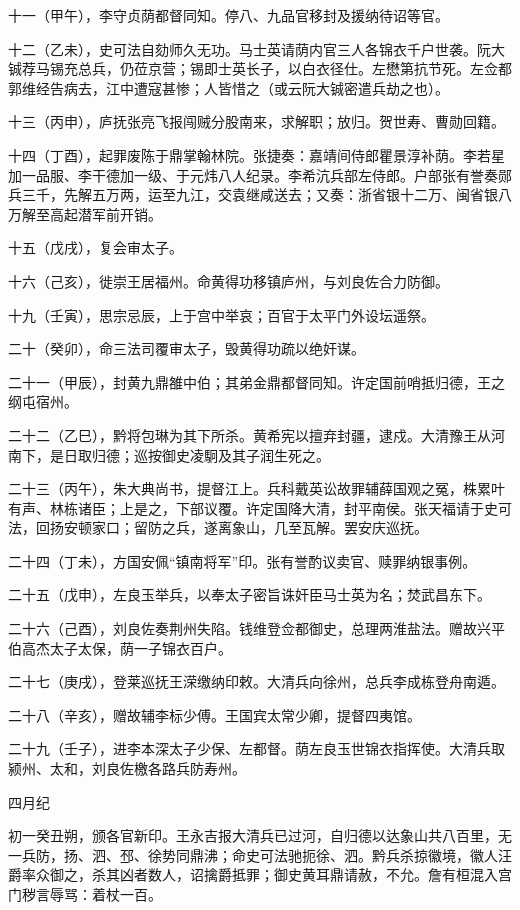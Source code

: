 \documentclass[]{article}
\begin{document}
十一（甲午），李守贞荫都督同知。停八、九品官移封及援纳待诏等官。

十二（乙未），史可法自劾师久无功。马士英请荫内官三人各锦衣千户世袭。阮大铖荐马锡充总兵，仍莅京营；锡即士英长子，以白衣径仕。左懋第抗节死。左佥都郭维经告病去，江中遭寇甚惨；人皆惜之（或云阮大铖密遣兵劫之也）。

十三（丙申），庐抚张亮飞报闯贼分股南来，求解职；放归。贺世寿、曹勋回籍。

十四（丁酉），起罪废陈于鼎掌翰林院。张捷奏：嘉靖间侍郎瞿景淳补荫。李若星加一品服、李干德加一级、于元炜八人纪录。李希沆兵部左侍郎。户部张有誉奏郧兵三千，先解五万两，运至九江，交袁继咸送去；又奏：浙省银十二万、闽省银八万解至高起潜军前开销。

十五（戊戌），复会审太子。

十六（己亥），徙崇王居福州。命黄得功移镇庐州，与刘良佐合力防御。

十九（壬寅），思宗忌辰，上于宫中举哀；百官于太平门外设坛遥祭。

二十（癸卯），命三法司覆审太子，毁黄得功疏以绝奸谋。

二十一（甲辰），封黄九鼎雒中伯；其弟金鼎都督同知。许定国前哨抵归德，王之纲屯宿州。

二十二（乙巳），黔将包琳为其下所杀。黄希宪以擅弃封疆，逮戍。大清豫王从河南下，是日取归德；巡按御史凌駉及其子润生死之。

二十三（丙午），朱大典尚书，提督江上。兵科戴英讼故罪辅薛国观之冤，株累叶有声、林栋诸臣；上是之，下部议覆。许定国降大清，封平南侯。张天福请于史可法，回扬安顿家口；留防之兵，遂离象山，几至瓦解。罢安庆巡抚。

二十四（丁未），方国安佩``镇南将军''印。张有誉酌议卖官、赎罪纳银事例。

二十五（戊申），左良玉举兵，以奉太子密旨诛奸臣马士英为名；焚武昌东下。

二十六（己酉），刘良佐奏荆州失陷。钱维登佥都御史，总理两淮盐法。赠故兴平伯高杰太子太保，荫一子锦衣百户。

二十七（庚戌），登莱巡抚王溁缴纳印敕。大清兵向徐州，总兵李成栋登舟南遁。

二十八（辛亥），赠故辅李标少傅。王国宾太常少卿，提督四夷馆。

二十九（壬子），进李本深太子少保、左都督。荫左良玉世锦衣指挥使。大清兵取颍州、太和，刘良佐檄各路兵防寿州。

四月纪

初一癸丑朔，颁各官新印。王永吉报大清兵已过河，自归德以达象山共八百里，无一兵防，扬、泗、邳、徐势同鼎沸；命史可法驰扼徐、泗。黔兵杀掠徽境，徽人汪爵率众御之，杀其凶者数人，诏擒爵抵罪；御史黄耳鼎请赦，不允。詹有桓混入宫门秽言辱骂：着杖一百。
\end{document}
